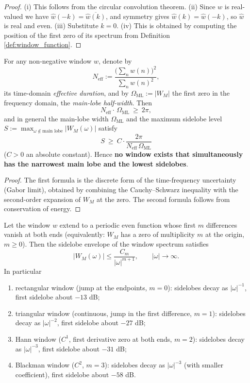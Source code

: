 \begin{proof}
(i) This follows from the circular convolution theorem. (ii) Since $w$ is real-valued we have $\hat w(-k)=\overline{\hat w(k)}$, and symmetry gives $\hat w(k)=\hat w(-k)$, so $\hat w$ is real and even. (iii) Substitute $k=0$. (iv) This is obtained by computing the position of the first zero of its spectrum from Definition \ref{def:window_function}.
\end{proof}

\begin{theorem}\label{thm:window_mainlobe_sidelobe_tradeoff_parallel}
For any non-negative window $w$, denote by
\[
N_{\mathrm{eff}}:=\frac{\big(\sum_n w(n)\big)^2}{\sum_n w(n)^2},
\]
its time-domain \emph{effective duration}, and by $\Omega_{\mathrm{ML}}:=|W_M|$ the first zero in the frequency domain, the \emph{main-lobe half-width}. Then
\[
N_{\mathrm{eff}}\cdot\,\Omega_{\mathrm{ML}}\ \ge\ 2\pi,
\]
and in general the main-lobe width $\Omega_{\mathrm{ML}}$ and the maximum sidelobe level $S:=\max_{\omega\notin\text{main lobe}}|W_M(\omega)|$ satisfy
\[
S\ \ge\ C\cdot\frac{2\pi}{N_{\mathrm{eff}}\,\Omega_{\mathrm{ML}}}
\]
($C>0$ an absolute constant). Hence \textbf{no window exists that simultaneously has the narrowest main lobe and the lowest sidelobes}.
\end{theorem}

\begin{proof}
The first formula is the discrete form of the time-frequency uncertainty (Gabor limit), obtained by combining the Cauchy--Schwarz inequality with the second-order expansion of $W_M$ at the zero. The second formula follows from conservation of energy.
\end{proof}

\begin{theorem}\label{thm:window_smoothness_decay_parallel}
Let the window $w$ extend to a periodic even function whose first $m$ differences vanish at both ends (equivalently: $W_M$ has a zero of multiplicity $m$ at the origin, $m\ge0$). Then the sidelobe envelope of the window spectrum satisfies
\[
|W_M(\omega)|\le\frac{C_m}{|\omega|^{m+1}},\qquad |\omega|\to\infty .
\]
In particular
\begin{enumerate}[label=(\roman*)]
    \item rectangular window (jump at the endpoints, $m=0$): sidelobes decay as $|\omega|^{-1}$, first sidelobe about $-13$ dB;
    \item triangular window (continuous, jump in the first difference, $m=1$): sidelobes decay as $|\omega|^{-2}$, first sidelobe about $-27$ dB;
    \item Hann window ($C^1$, first derivative zero at both ends, $m=2$): sidelobes decay as $|\omega|^{-3}$, first sidelobe about $-31$ dB;
    \item Blackman window ($C^2$, $m=3$): sidelobes decay as $|\omega|^{-3}$ (with smaller coefficient), first sidelobe about $-58$ dB.
\end{enumerate}
\end{theorem}

